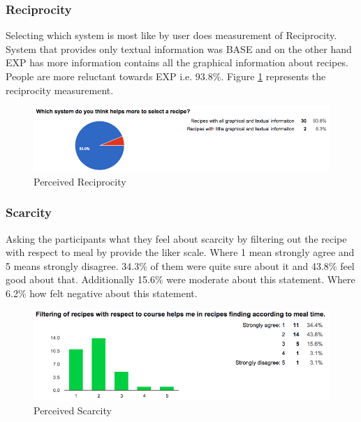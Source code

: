 \subsubsection{Reciprocity}
Selecting which system is most like by user does measurement of Reciprocity. System that provides only textual information was BASE and on the other hand EXP has more information contains all the graphical information about recipes. People are more reluctant towards EXP i.e. 93.8\%. Figure \ref{fig:ch5_stat_reciprocity} represents the reciprocity measurement.
\begin{figure}[h]
	\centering
	\includegraphics[width=1\linewidth]{figures/ch5_stat_reciprocity}
	\caption{Perceived Reciprocity}
	\label{fig:ch5_stat_reciprocity}
\end{figure}
\newpage
\subsubsection{Scarcity}
Asking the participants what they feel about scarcity by filtering out the recipe with respect to meal by provide the liker scale. Where 1 mean strongly agree and 5 means strongly disagree.  34.3\% of them were quite sure about it and 43.8\% feel good about that. Additionally 15.6\% were moderate about this statement. Where 6.2\% how felt negative about this statement. 
\begin{figure}[h]
	\centering
	\includegraphics[width=1\linewidth]{figures/ch5_stat_scarcity.png}
	\caption{Perceived Scarcity}
	\label{fig:ch5_stat_scarcity}
\end{figure}
